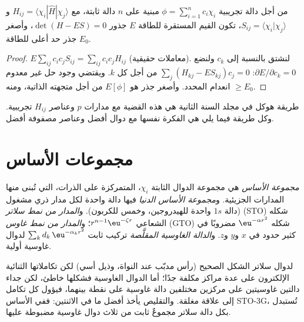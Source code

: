 \begin{proposition}\label{prop:b3:computational-chemistry:linear-variation}
من أجل دالة تجريبية $\phi = \sum_{i=1}^n c_i\chi_i$ مبنية على $n$ دالة ثابتة،
مع $H_{ij} = \langle\chi_i|\hat H|\chi_j\rangle$ و$S_{ij} = \langle\chi_i|\chi_j
\rangle$، تكون القيم المستقرة للطاقة $E$ جذور $\det(H - ES) = 0$، 
وأصغر جذر حد أعلى للطاقة $E_0$.
\end{proposition}

\begin{proof}
$E\sum_{ij}c_ic_jS_{ij} = \sum_{ij}c_ic_jH_{ij}$ (معاملات حقيقية). لنشتق
بالنسبة إلى $c_k$ ولنضع $\partial E/\partial c_k = 0$: $\sum_j(H_{kj} -
ES_{kj})c_j = 0$ من أجل كل $k$. ويقتضي وجود حل غير معدوم انعدام
المحدد. وأصغر جذر هو $E[\phi]$ من أجل متجهته الذاتية، ومنه $\ge E_0$.
\end{proof}

طريقة هوكل في مجلد السنة الثانية هي هذه القضية مع مدارات $p$
وعناصر $H_{ij}$ تجريبية. وكل طريقة فيما يلي هي الفكرة نفسها مع
دوال أفضل وعناصر مصفوفة أفضل.

\section{مجموعات الأساس}

\begin{definition}\label{def:b3:computational-chemistry:basis}
\emph{مجموعة الأساس} هي مجموعة الدوال الثابتة $\chi_i$،
المتمركزة على الذرات، التي تُبنى منها المدارات الجزيئية. 
و\emph{مجموعة الأساس الدنيا} فيها دالة واحدة لكل
مدار ذري مشغول (دالة $1s$ واحدة للهيدروجين، وخمس للكربون). و\emph{المدار من نمط
سلاتر} (STO) شكله الشعاعي
$r^{n-1}\eu^{-\zeta r}$؛ و\emph{المدار من نمط غاوس}
(GTO) شكله $\eu^{-\alpha r^2}$ مضروبًا في كثير حدود في $x$ و$y$
و$z$. و\emph{الدالة الغاوسية المقلَّصة}
تركيب ثابت $\sum_kd_k\,\eu^{-\alpha_kr^2}$ لدوال غاوسية أولية.
\end{definition}

لدوال سلاتر الشكل الصحيح (رأس مدبّب عند النواة، وذيل
أسي) لكن تكاملاتها الثنائية الإلكترون على عدة مراكز
مكلفة جدًا؛ أما الدوال الغاوسية فشكلها خاطئ، لكن جداء دالتين
غاوسيتين على مركزين مختلفين دالة غاوسية على نقطة بينهما، فيؤول
كل تكامل إلى علاقة مغلقة. والتقليص يأخذ أفضل ما في
الاثنتين: ففي الأساس STO-3G، تُستبدل بكل دالة سلاتر مجموعٌ ثابت من
ثلاث دوال غاوسية مضبوطة عليها.


